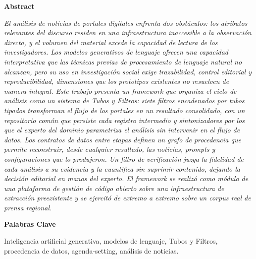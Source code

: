\documentclass[12pt,a4paper,twocolumn]{article}
\begin{document}

{\fontsize{10}{12}\selectfont
\noindent\textbf{Abstract}\par
\noindent\textit{El análisis de noticias de portales digitales enfrenta dos obstáculos: los atributos relevantes del discurso residen en una infraestructura inaccesible a la observación directa, y el volumen del material excede la capacidad de lectura de los investigadores. Los modelos generativos de lenguaje ofrecen una capacidad interpretativa que las técnicas previas de procesamiento de lenguaje natural no alcanzan, pero su uso en investigación social exige trazabilidad, control editorial y reproducibilidad, dimensiones que los prototipos existentes no resuelven de manera integral. Este trabajo presenta un framework que organiza el ciclo de análisis como un sistema de Tubos y Filtros: siete filtros encadenados por tubos tipados transforman el flujo de los portales en un resultado consolidado, con un repositorio común que persiste cada registro intermedio y sintonizadores por los que el experto del dominio parametriza el análisis sin intervenir en el flujo de datos. Los contratos de datos entre etapas definen un grafo de procedencia que permite reconstruir, desde cualquier resultado, las noticias, prompts y configuraciones que lo produjeron. Un filtro de verificación juzga la fidelidad de cada análisis a su evidencia y la cuantifica sin suprimir contenido, dejando la decisión editorial en manos del experto. El framework se realizó como módulo de una plataforma de gestión de código abierto sobre una infraestructura de extracción preexistente y se ejercitó de extremo a extremo sobre un corpus real de prensa regional.}\par
\vspace{0.5em}
\noindent\textbf{Palabras Clave}\par
\noindent Inteligencia artificial generativa, modelos de lenguaje, Tubos y Filtros, procedencia de datos, agenda-setting, análisis de noticias.\par
}
\vspace{0.4em}
\end{document}
